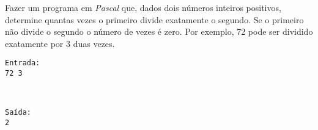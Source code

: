 \item Fazer um programa em \emph{Pascal} que,
    dados dois números inteiros positivos, determine quantas vezes o
    primeiro  divide exatamente  o segundo.  Se o  primeiro não  divide o
    segundo o número de vezes é zero. Por exemplo, 72 pode ser dividido
    exatamente por 3 duas vezes.

\begin{minipage}{5cm}
\begin{verbatim}
Entrada:
72 3
\end{verbatim}
\end{minipage} \
\begin{minipage}{5cm}
\begin{verbatim}
Saída:
2
\end{verbatim}
\end{minipage}